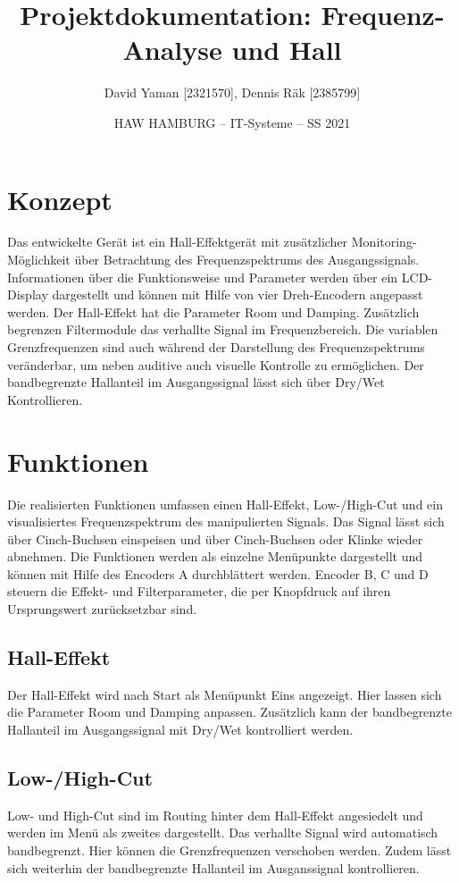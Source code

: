 \documentclass[12pt]{article}
\title{Projektdokumentation: Frequenz-Analyse und Hall}        %
\author{David Yaman [2321570], Dennis Räk [2385799]}            %
\date{HAW HAMBURG -- IT-Systeme -- SS 2021}                    %
\begin{document}
\maketitle
\newpage
\tableofcontents
\newpage
\section{Konzept}
Das entwickelte Gerät ist ein Hall-Effektgerät mit zusätzlicher Monitoring-Möglichkeit über Betrachtung des Frequenzspektrums des Ausgangssignals. 
Informationen über die Funktionsweise und Parameter werden über ein LCD-Display dargestellt und können mit Hilfe von vier Dreh-Encodern angepasst werden. 
Der Hall-Effekt hat die Parameter Room und Damping. Zusätzlich begrenzen Filtermodule das verhallte Signal im Frequenzbereich. 
Die variablen Grenzfrequenzen sind auch während der Darstellung des Frequenzspektrums veränderbar, um neben auditive auch visuelle Kontrolle zu ermöglichen. 
Der bandbegrenzte Hallanteil im Ausgangssignal lässt sich über Dry/Wet Kontrollieren.
\section{Funktionen}
Die realisierten Funktionen umfassen einen Hall-Effekt, Low-/High-Cut und ein visualisiertes Frequenzspektrum des manipulierten Signals. 
Das Signal lässt sich über Cinch-Buchsen einspeisen und über Cinch-Buchsen oder Klinke wieder abnehmen.
Die Funktionen werden als einzelne Menüpunkte dargestellt und können mit Hilfe des Encoders A durchblättert werden. 
Encoder B, C und D steuern die Effekt- und Filterparameter, die per Knopfdruck auf ihren Ursprungswert zurücksetzbar sind.
\subsection{Hall-Effekt}
Der Hall-Effekt wird nach Start als Menüpunkt Eins angezeigt. 
Hier lassen sich die Parameter Room und Damping anpassen.
Zusätzlich kann der bandbegrenzte Hallanteil im Ausgangssignal mit Dry/Wet kontrolliert werden.
\subsection{Low-/High-Cut}
Low- und High-Cut sind im Routing hinter dem Hall-Effekt angesiedelt und werden im Menü als zweites dargestellt. 
Das verhallte Signal wird automatisch bandbegrenzt.  
Hier können die Grenzfrequenzen verschoben werden. 
Zudem lässt sich weiterhin der bandbegrenzte Hallanteil im Ausganssignal kontrollieren. 
\end{document}
